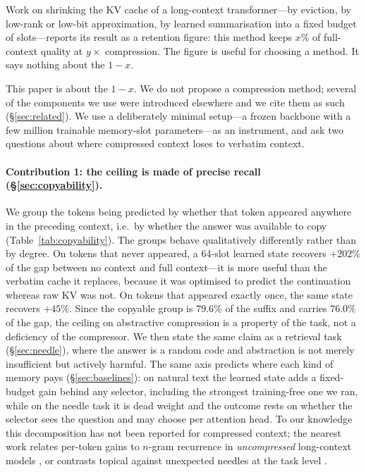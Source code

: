 \documentclass[11pt]{article}
\begin{document}
Work on shrinking the KV cache of a long-context transformer---by eviction, by
low-rank or low-bit approximation, by learned summarisation into a fixed budget
of slots---reports its result as a retention figure: this method keeps $x\%$ of
full-context quality at $y\times$ compression. The figure is useful for choosing
a method. It says nothing about the $1-x$.

This paper is about the $1-x$. We do not propose a compression method; several
of the components we use were introduced elsewhere and we cite them as such
(\S\ref{sec:related}). We use a deliberately minimal setup---a frozen backbone
with a few million trainable memory-slot parameters---as an instrument, and ask
two questions about where compressed context loses to verbatim context.

\paragraph{Contribution 1: the ceiling is made of precise recall
(\S\ref{sec:copyability}).}
We group the tokens being predicted by whether that token appeared anywhere in
the preceding context, i.e.\ by whether the answer was available to copy
(Table~\ref{tab:copyability}). The
groups behave qualitatively differently rather than by degree. On tokens that
never appeared, a 64-slot learned state recovers $+202\%$ of the gap between no
context and full context---it is more useful than the verbatim cache it replaces,
because it was optimised to predict the continuation whereas raw KV was not. On
tokens that appeared exactly once, the same state recovers $+45\%$. Since the
copyable group is $79.6\%$ of the suffix and carries $76.0\%$ of the gap, the
ceiling on abstractive compression is a property of the task, not a deficiency
of the compressor. We then state the same claim as a retrieval task
(\S\ref{sec:needle}), where the answer is a random code and abstraction is not
merely insufficient but actively harmful. The same axis predicts where each
kind of memory pays (\S\ref{sec:baselines}): on natural text the learned state
adds a fixed-budget gain behind any selector, including the strongest
training-free one we ran, while on the needle task it is dead weight and the
outcome rests on whether the selector sees the question and may choose per
attention head. To our knowledge this decomposition has not been reported for
compressed context; the nearest work relates per-token gains to $n$-gram recurrence in
\emph{uncompressed} long-context models \citep{tokensbenefit}, or contrasts
topical against unexpected needles at the task level \citep{gistboundary}.
\end{document}
